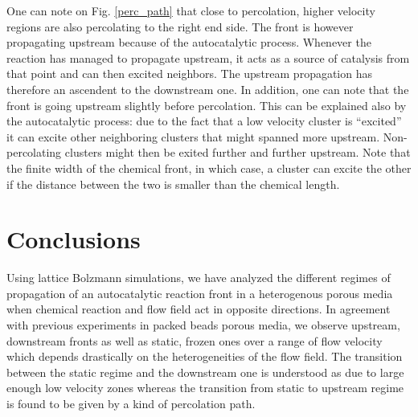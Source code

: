 \documentclass[doublecol]{epl2}
\begin{document}
One can note on Fig. \ref{perc_path} that close to percolation, higher velocity regions are also percolating to the right end side. The front is however propagating upstream because of the autocatalytic process. Whenever the reaction has managed to propagate upstream, it acts as a source of catalysis from that point and can then excited neighbors. The upstream propagation has therefore an ascendent to the downstream one.
In addition, one can note that the front is going upstream slightly before percolation. This can be explained also by the autocatalytic process: due to the fact that a low velocity cluster is ``excited'' it can excite other neighboring clusters that might spanned more upstream. Non-percolating clusters might then be exited further and further upstream. Note that the finite width of the chemical front, in which case, a cluster can excite the other if the distance between the two is smaller than the chemical length.


\section{Conclusions}
Using lattice Bolzmann simulations, we have analyzed the different regimes of propagation of an autocatalytic reaction front in a heterogenous porous media when chemical reaction and flow field act in opposite directions. In agreement with previous experiments in packed beads porous media, we observe upstream, downstream fronts as well as static, frozen ones over a range of flow velocity which depends drastically on the heterogeneities of the flow field. The transition between the static regime and the downstream one is understood as due to large enough low velocity zones whereas the transition from static to upstream regime is found to be given by a kind of percolation path.




 	
	
\end{document}

